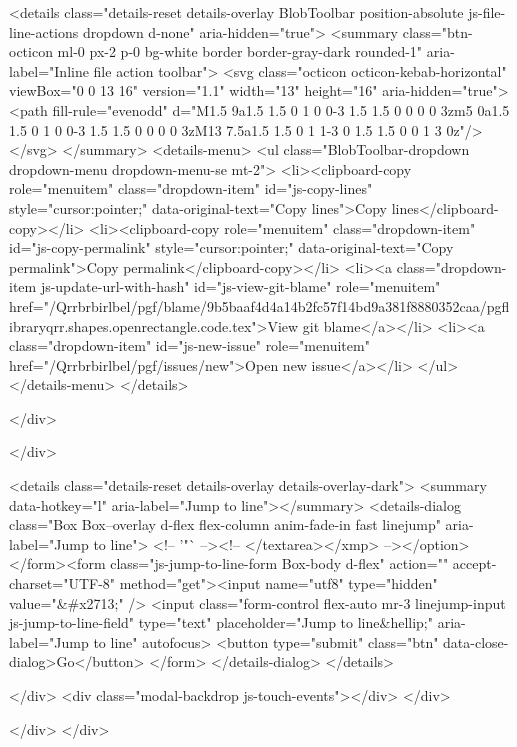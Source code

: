   <details class="details-reset details-overlay BlobToolbar position-absolute js-file-line-actions dropdown d-none" aria-hidden="true">
    <summary class="btn-octicon ml-0 px-2 p-0 bg-white border border-gray-dark rounded-1" aria-label="Inline file action toolbar">
      <svg class="octicon octicon-kebab-horizontal" viewBox="0 0 13 16" version="1.1" width="13" height="16" aria-hidden="true"><path fill-rule="evenodd" d="M1.5 9a1.5 1.5 0 1 0 0-3 1.5 1.5 0 0 0 0 3zm5 0a1.5 1.5 0 1 0 0-3 1.5 1.5 0 0 0 0 3zM13 7.5a1.5 1.5 0 1 1-3 0 1.5 1.5 0 0 1 3 0z"/></svg>
    </summary>
    <details-menu>
      <ul class="BlobToolbar-dropdown dropdown-menu dropdown-menu-se mt-2">
        <li><clipboard-copy role="menuitem" class="dropdown-item" id="js-copy-lines" style="cursor:pointer;" data-original-text="Copy lines">Copy lines</clipboard-copy></li>
        <li><clipboard-copy role="menuitem" class="dropdown-item" id="js-copy-permalink" style="cursor:pointer;" data-original-text="Copy permalink">Copy permalink</clipboard-copy></li>
        <li><a class="dropdown-item js-update-url-with-hash" id="js-view-git-blame" role="menuitem" href="/Qrrbrbirlbel/pgf/blame/9b5baaf4d4a14b2fc57f14bd9a381f8880352caa/pgflibraryqrr.shapes.openrectangle.code.tex">View git blame</a></li>
          <li><a class="dropdown-item" id="js-new-issue" role="menuitem" href="/Qrrbrbirlbel/pgf/issues/new">Open new issue</a></li>
      </ul>
    </details-menu>
  </details>

  </div>

    </div>

  

  <details class="details-reset details-overlay details-overlay-dark">
    <summary data-hotkey="l" aria-label="Jump to line"></summary>
    <details-dialog class="Box Box--overlay d-flex flex-column anim-fade-in fast linejump" aria-label="Jump to line">
      <!-- '"` --><!-- </textarea></xmp> --></option></form><form class="js-jump-to-line-form Box-body d-flex" action="" accept-charset="UTF-8" method="get"><input name="utf8" type="hidden" value="&#x2713;" />
        <input class="form-control flex-auto mr-3 linejump-input js-jump-to-line-field" type="text" placeholder="Jump to line&hellip;" aria-label="Jump to line" autofocus>
        <button type="submit" class="btn" data-close-dialog>Go</button>
</form>    </details-dialog>
  </details>



  </div>
  <div class="modal-backdrop js-touch-events"></div>
</div>

    </div>
  </div>

